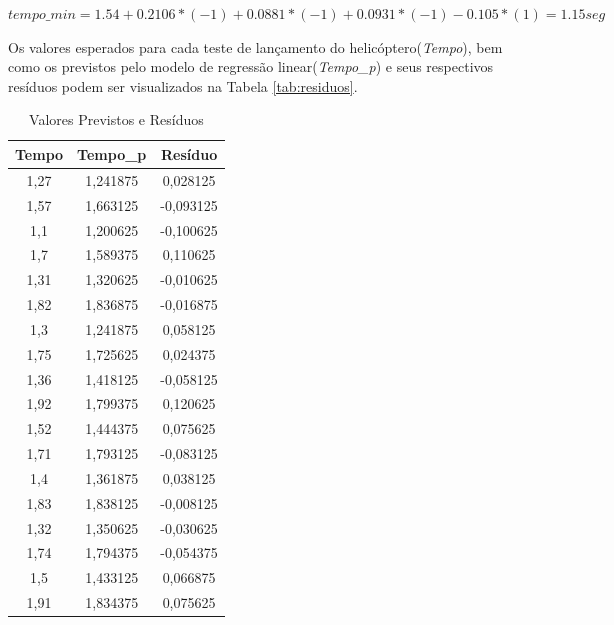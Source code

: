   $tempo\_min =  1.54 + 0.2106*(-1) + 0.0881*(-1) + 0.0931*(-1) - 0.105*(1) = 1.15seg$

Os valores esperados para cada teste de lançamento do helicóptero(\textit{Tempo}), bem como os previstos pelo modelo de regressão linear(\textit{Tempo\_p}) e seus respectivos resíduos podem ser visualizados na Tabela \ref{tab:residuos}.

\begin{table}[H]
  \small
  \center
  \caption{Valores Previstos e Resíduos}
  \begin{tabular}{|c|c|c|}
  \hline
  \textbf{Tempo} & \textbf{Tempo\_p} & \textbf{Resíduo} \\ \hline
  1,27           & 1,241875          & 0,028125         \\ \hline
  1,57           & 1,663125          & -0,093125        \\ \hline
  1,1            & 1,200625          & -0,100625        \\ \hline
  1,7            & 1,589375          & 0,110625         \\ \hline
  1,31           & 1,320625          & -0,010625        \\ \hline
  1,82           & 1,836875          & -0,016875        \\ \hline
  1,3            & 1,241875          & 0,058125         \\ \hline
  1,75           & 1,725625          & 0,024375         \\ \hline
  1,36           & 1,418125          & -0,058125        \\ \hline
  1,92           & 1,799375          & 0,120625         \\ \hline
  1,52           & 1,444375          & 0,075625         \\ \hline
  1,71           & 1,793125          & -0,083125        \\ \hline
  1,4            & 1,361875          & 0,038125         \\ \hline
  1,83           & 1,838125          & -0,008125        \\ \hline
  1,32           & 1,350625          & -0,030625        \\ \hline
  1,74           & 1,794375          & -0,054375        \\ \hline
  1,5            & 1,433125          & 0,066875         \\ \hline
  1,91           & 1,834375          & 0,075625         \\ \hline

\end{tabular}
\end{table}
